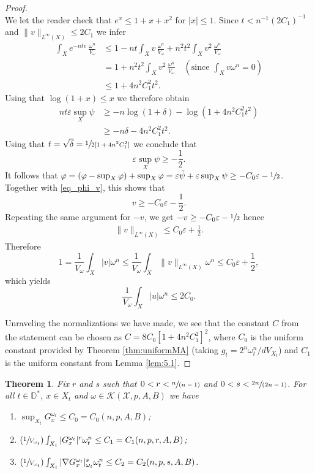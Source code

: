 \documentclass[JEP,XML,SOM,Unicode,published]{cedram}
\newcommand{\Psfrac}[2]{(\sfrac{#1}{#2})}
\newcommand{\spfrac}[2]{\sfrac{#1}{(#2)}}
\newtheorem{theorem}{Theorem}[section]
\theoremstyle{definition}
\newcommand{\D}{\mathbb D}
\begin{document}
\begin{proof}
\[\]
We let the reader check that $e^x \leq 1+x+x^2$ for $|x| \leq 1$.
Since $t<n^{-1}(2C_1)^{-1}$ and $\|v\|_{L^{\infty}(X)} \leq 2C_1$ we infer
\begin{align*}
\int_X e^{-ntv}\,\frac{\omega^n}{V_\omega}&\leq 1- nt\int_X v\,\frac{\omega^n}{V_\omega} + n^2 t^2\int_X v^2\,\frac{\omega^n}{V_\omega}\\
&= 1+ n^2 t^2\int_X v^2\,\frac{\omega^n}{V_\omega} \quad (\text{since } \int_X v\omega^n=0) \\
&\leq 1+ 4n^2 C_1^2 t^2.
\end{align*}
Using that $\log(1+x) \leq x$ we therefore obtain
\begin{align*}
nt\varepsilon \sup_X \psi &\geq - n\log(1+\delta)- \log \left(1+4n^2C_1^2 t^2 \right)\\
&\geq - n \delta -4n^2 C_1^2 t^2.
\end{align*}
Using that $t= \sqrt{\delta}=\sfrac{1}{2[1+4n^2C_1^2]}$ we conclude that
\[
\varepsilon \sup_X \psi \geq -\frac{1}{2}.
\]
It follows that
$ \varphi= (\varphi -\sup_X \varphi)+ \sup_X \varphi = \varepsilon \tilde{\psi}+ \varepsilon \sup_X \psi
\geq -C_0 \varepsilon -\sfrac{1}{2}$.
Together with \eqref{eq_phi_v}, this shows that
\[
v\geq - C_0 \varepsilon - \frac{1}{2}.
\]
Repeating the same argument for $-v$, we get $-v\geq - C_0\varepsilon - \sfrac{1}{2}$ hence
\begin{align*}
\|v\|_{L^\infty(X)}\leq C_0 \varepsilon+ \frac{1}{2}.
\end{align*}
Therefore
\[
1=\frac{1}{V_\omega}\int_X |v|\omega^n\leq \frac{1}{V_\omega}\int_X \|v\|_{L^\infty(X)}\omega^n \leq C_0 \varepsilon+ \frac{1}{2},
\]
which yields
\[
\frac{1}{V_\omega} \int_X |u|\omega^n \leq 2 C_0.
\]

Unraveling the normalizations we have made, we see that the constant $C$ from the statement can be chosen as
$C=8C_0[1+4n^2C_1^2]^2$, where $C_0$ is the uniform constant provided by Theorem \ref{thm:uniformMA}
(taking $g_t=2^n \omega_t^n/dV_{X_t}$)
and $C_1$ is the uniform constant from Lemma \ref{lem:5.1}.
\end{proof}

 \label{sec:green}

\begin{theorem} \label{thm:Green1}
Fix $r$ and $s$ such that $0<r<\spfrac{n}{n-1}$ and $0<s< \spfrac{2n}{2n-1}$.
For all $t \in \D^*$, $x \in X_t$ and $\omega \in {\mathcal K}(\mathcal{X},p,A,B)$ we have
\begin{enumerate}
\item\label{thm:Green11} $\sup_{X_t} G^{\omega_t}_x \leq C_0=C_0(n,p,A,B)$;

\item\label{thm:Green12} $\Psfrac{1}{V_{\omega_t}} \int_{X_t} |G^{\omega_t}_x|^r \omega_t^n \leq C_1=C_1(n,p,r,A,B)$;

\item\label{thm:Green13} $\Psfrac{1}{V_{\omega_t}} \int_{X_t} |\nabla G^{\omega_t}_x|_{\omega_t}^s \omega_t^n \leq C_2=C_2(n,p,s,A,B)$.
\end{enumerate}
\end{theorem}
\end{document}
